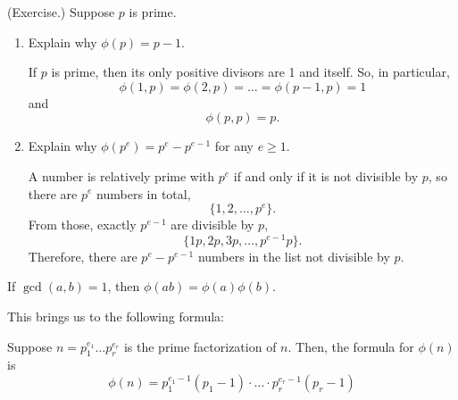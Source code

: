 \documentclass[letterpaper]{article}
\begin{document}
\begin{mdframed}
    (Exercise.) Suppose $p$ is prime. 
    \begin{enumerate}
        \item Explain why $\phi(p) = p - 1$. 
        \begin{mdframed}
            If $p$ is prime, then its only positive divisors are 1 and itself. So, in particular, 
            \[\phi(1, p) = \phi(2, p) = \hdots = \phi(p - 1, p) = 1\]
            and 
            \[\phi(p, p) = p.\]
        \end{mdframed}

        \item Explain why $\phi(p^e) = p^e - p^{e - 1}$ for any $e \geq 1$. 
        \begin{mdframed}
            A number is relatively prime with $p^e$ if and only if it is not divisible by $p$, so there are $p^e$ numbers in total, \[\{1, 2, \hdots, p^e\}.\] From those, exactly $p^{e - 1}$ are divisible by $p$, \[\{1p, 2p, 3p, \hdots, p^{e - 1}p\}.\] Therefore, there are $p^e - p^{e - 1}$ numbers in the list not divisible by $p$.
        \end{mdframed}
    \end{enumerate}
\end{mdframed}

\begin{lemma}{}{}
    If $\gcd(a, b) = 1$, then $\phi(ab) = \phi(a)\phi(b)$. 
\end{lemma}
This brings us to the following formula:
\begin{theorem}{}{}
    Suppose $n = p_1^{e_1} \hdots p_r^{e_r}$ is the prime factorization of $n$. Then, the formula for $\phi(n)$ is 
    \[\phi(n) = p_{1}^{e_1 - 1}(p_1 - 1) \cdot \hdots \cdot p_{r}^{e_r - 1}(p_r - 1)\]
\end{theorem}
\end{document}
